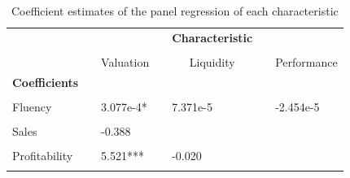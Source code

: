 \documentclass[11pt]{article}
\begin{document}
\begin{table}[h]
\centering
    
\caption{Coefficient estimates of the panel regression of each characteristic}
\label{tab: panelregression}
\begin{tabular}{llclllc}
\toprule
                                          &  &                              &  & \multicolumn{1}{c}{\textbf{Characteristic}} &  &                              \\\cline{3-7}\\
                                          &  & Valuation                   &  & \multicolumn{1}{c}{Liquidity}               &  & Performance                  \\ \midrule
\textbf{Coefficients}                     &  &                              &  & \multicolumn{1}{c}{}                        &  &                              \\ \midrule
\multicolumn{1}{l|}{}                     &  & \multicolumn{1}{l}{}         &  &                                             &  &                              \\
\multicolumn{1}{l|}{Fluency}              &  & \multicolumn{1}{l}{3.077e-4*} &  & 7.371e-5                                     &  & \multicolumn{1}{l}{-2.454e-5} \\
\multicolumn{1}{l|}{}                     &  & \multicolumn{1}{l}{}         &  &                                             &  &                              \\
\multicolumn{1}{l|}{Sales}                &  & \multicolumn{1}{l}{-0.388}   &  &                                             &  &                              \\
\multicolumn{1}{l|}{}                     &  & \multicolumn{1}{l}{}         &  &                                             &  &                              \\
\multicolumn{1}{l|}{Profitability}        &  & \multicolumn{1}{l}{5.521***} &  & -0.020                                      &  &                              \\
\multicolumn{1}{l|}{}                     &  & \multicolumn{1}{l}{}         &  &                                             &  &                              \\

\end{tabular}
\end{table}
\end{document}
